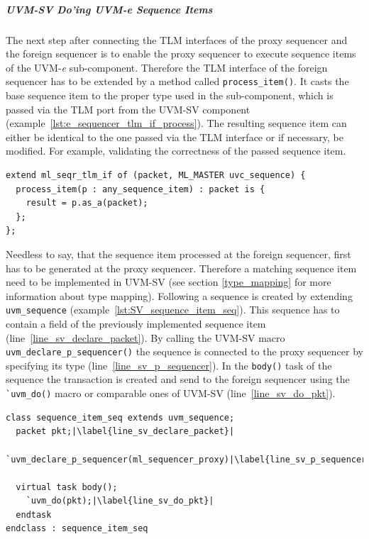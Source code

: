 \subparagraph{UVM-SV Do'ing UVM-\textit{e} Sequence Items}
\lstset{language=e, numbers = left, escapechar=|, breaklines=true}
The next step after connecting the TLM interfaces of the proxy sequencer and the foreign sequencer is to enable the proxy sequencer to execute sequence items of the UVM-\textit{e} sub-component. Therefore the TLM interface of the foreign sequencer has to be extended by a method called \lstinline$process_item()$. It casts the  base sequence item to the proper type used in the sub-component, which is passed via the TLM port from the UVM-SV component (example~\ref{lst:e_sequencer_tlm_if_process}). The resulting sequence item can either be identical to the one passed via the TLM interface or if necessary, be modified. For example, validating the correctness of the passed sequence item.
\lstset{language=e, numbers = left, escapechar=|, breaklines=true}
\begin{lstlisting}[frame=htrbl, caption={\textit{e}: processing the sequence item send from the UVM-SV component},
label={lst:e_sequencer_tlm_if_process}]
extend ml_seqr_tlm_if of (packet, ML_MASTER uvc_sequence) {
  process_item(p : any_sequence_item) : packet is {
    result = p.as_a(packet);
  };
};
\end{lstlisting}
Needless to say, that the sequence item processed at the foreign sequencer, first has to be generated at the proxy sequencer. Therefore a matching sequence item need to be implemented in UVM-SV (see section \ref{type_mapping} for more information about type mapping). Following a sequence is created by extending \lstinline$uvm_sequence$ (example~\ref{lst:SV_sequence_item_seq}). This sequence has to contain a field of the previously implemented sequence item (line~\ref{line_sv_declare_packet}). By calling the UVM-SV macro \lstinline$uvm_declare_p_sequencer()$ the sequence is connected to the proxy sequencer by specifying its type (line~\ref{line_sv_p_sequencer}). In the \lstinline$body()$ task of the sequence the transaction is created and send to the foreign sequencer using the \lstinline$`uvm_do()$ macro or comparable ones of UVM-SV (line~\ref{line_sv_do_pkt}).
\lstset{language=SystemVerilog, numbers = left, escapechar=|, breaklines=true}
\begin{lstlisting}[frame=htrbl, caption={SystemVerilog: sending an UVM-\textit{e} sequence item  from  an UVM-SV sequence},
label={lst:SV_sequence_item_seq}]
class sequence_item_seq extends uvm_sequence;
  packet pkt;|\label{line_sv_declare_packet}|
  `uvm_declare_p_sequencer(ml_sequencer_proxy)|\label{line_sv_p_sequencer}|

  virtual task body();
    `uvm_do(pkt);|\label{line_sv_do_pkt}|
  endtask  
endclass : sequence_item_seq
\end{lstlisting}
